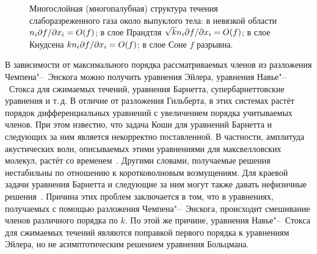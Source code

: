 \begin{figure}
    \centering
    \caption[
        Многослойная (многопалубная) структура течения слаборазреженного газа около выпуклого тела.
    ]{
        Многослойная (многопалубная) структура течения слаборазреженного газа около выпуклого тела:
        в невязкой области \(n_i\Pder[f]{x_i}=\OO{f}\);
        в слое Прандтля \(\sqrt{k}n_i\Pder[f]{x_i}=\OO{f}\);
        в слое Кнудсена \(kn_i\Pder[f]{x_i}=\OO{f}\);
        в слое Соне \(f\) разрывна.
    }\label{fig:asymptotic_structure}
\end{figure}

В зависимости от максимального порядка рассматриваемых членов из разложения Чемпена"--~Энскога можно получить
уравнения Эйлера, уравнения Навье"--~Стокса для сжимаемых течений, уравнения Барнетта, супербарнеттовские уравнения и т.\,д.
В отличие от разложения Гильберта, в этих системах растёт порядок дифференциальных уравнений
с увеличением порядка учитываемых членов.
При этом известно, что задача Коши для уравнений Барнетта и следующих за ним является некорректно поставленной.
В частности, амплитуда акустических волн, описываемых этими уравнениями для максвелловских молекул,
растёт со временем~\cite{Bobylev1982}.
Другими словами, получаемые решения нестабильны по отношению к коротковолновым возмущениям.
Для краевой задачи уравнения Барнетта и следующие за ним могут также давать нефизичные решения~\cite{Cercignani1973}.
Причина этих проблем заключается в том, что в уравнениях, получаемых с помощью разложения Чемпена"--~Энскога,
происходит смешивание членов различного порядка по \(k\).
По этой же причине, уравнения Навье"--~Стокса для сжимаемых течений являются поправкой первого порядка к уравнениям Эйлера,
но не асимптотическим решением уравнения Больцмана.

